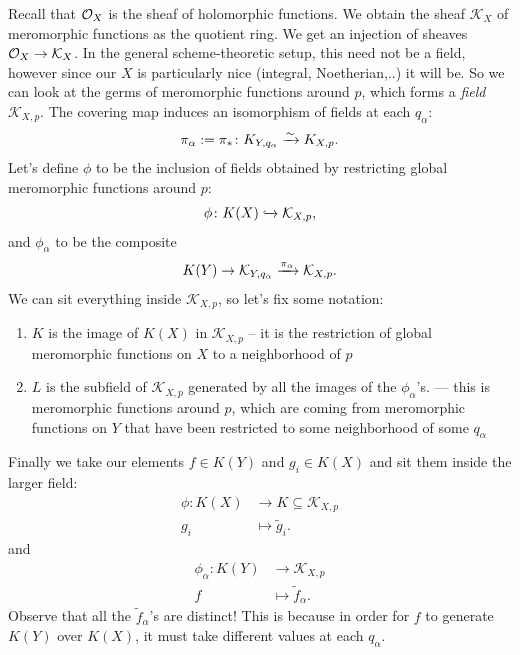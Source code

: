 \documentclass[11pt]{amsart}
\let\til\widetilde
\begin{document}
Recall that $\mathcal{O}_X$ is the sheaf of holomorphic functions. We obtain the sheaf $\mathcal{K}_X$ of meromorphic functions as the quotient ring. We get an injection of sheaves $\mathcal{O}_X \to \mathcal{K}_X$. In the general scheme-theoretic setup, this need not be a field, however since our $X$ is particularly nice (integral, Noetherian,..) it will be. So we can look at the germs of meromorphic functions around $p$, which forms a \textit{field} $\mathcal{K}_{X,p}$. The covering map induces an isomorphism of fields at each $q_\alpha$:
\begin{align*}
    \pi_\alpha := \pi_\ast \colon K_{Y,q_\alpha} \xrightarrow{\sim} K_{X,p}.
\end{align*}
Let's define $\phi$ to be the inclusion of fields obtained by restricting global meromorphic functions around $p$:
\begin{align*}
    \phi \colon K(X) \xhookrightarrow{} \mathcal{K}_{X,p},
\end{align*}
and $\phi_\alpha$ to be the composite
\begin{align*}
    K(Y) \to \mathcal{K}_{Y,q_\alpha} \xrightarrow{\pi_\alpha} \mathcal{K}_{X,p}.
\end{align*}
%
We can sit everything inside $\mathcal{K}_{X,p}$, so let's fix some notation:
\begin{enumerate}
    \item $K$ is the image of $K(X)$ in $\mathcal{K}_{X,p}$ -- it is the restriction of global meromorphic functions on $X$ to a neighborhood of $p$
    \item $L$ is the subfield of $\mathcal{K}_{X,p}$ generated by all the images of the $\phi_\alpha$'s. --- this is meromorphic functions around $p$, which are coming from meromorphic functions on $Y$ that have been restricted to some neighborhood of some $q_\alpha$
\end{enumerate}
Finally we take our elements $f \in K(Y)$ and $g_i \in K(X)$ and sit them inside the larger field:
\begin{align*}
    \phi \colon K(X) &\to K \subseteq\mathcal{K}_{X,p} \\
    g_i &\mapsto \til{g}_i.
\end{align*}
and
\begin{align*}
    \phi_\alpha \colon K(Y) &\to \mathcal{K}_{X,p} \\
    f &\mapsto \til{f}_\alpha.
\end{align*}
%
Observe that all the $\til{f}_\alpha$'s are distinct! This is because in order for $f$ to generate $K(Y)$ over $K(X)$, it must take different values at each $q_\alpha$.
\end{document}

